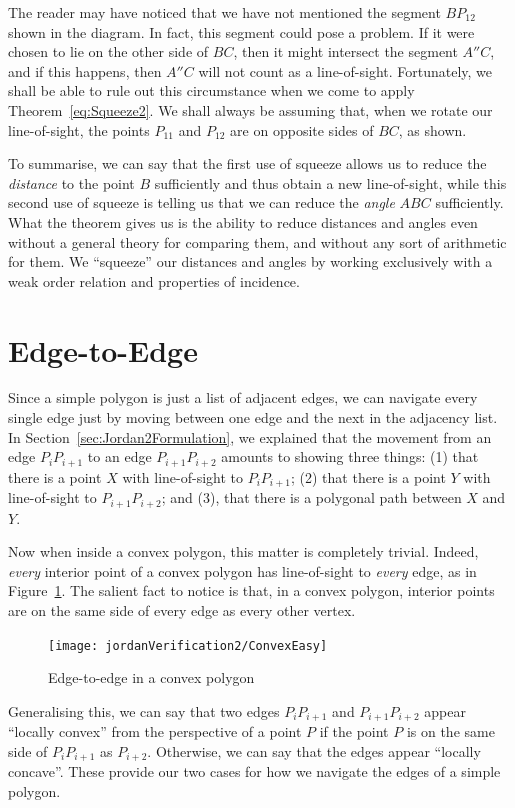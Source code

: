 The reader may have noticed that we have not mentioned the segment $BP_{12}$ shown in the diagram. In fact, this segment could pose a problem. If it were chosen to lie on the other side of $BC$, then it might intersect the segment $A''C$, and if this happens, then $A''C$ will not count as a line-of-sight. Fortunately, we shall be able to rule out this circumstance when we come to apply Theorem~\ref{eq:Squeeze2}. We shall always be assuming that, when we rotate our line-of-sight, the points $P_{11}$ and $P_{12}$ are on opposite sides of $BC$, as shown.

To summarise, we can say that the first use of squeeze allows us to reduce the \emph{distance} to the point $B$ sufficiently and thus obtain a new line-of-sight, while this second use of squeeze is telling us that we can reduce the \emph{angle} $ABC$ sufficiently. What the theorem gives us is the ability to reduce distances and angles even without a general theory for comparing them, and without any sort of arithmetic for them. We ``squeeze'' our distances and angles by working exclusively with a weak order relation and properties of incidence.

\section{Edge-to-Edge}\label{sec:NavigationVerification}
Since a simple polygon is just a list of adjacent edges, we can navigate every single edge just by moving between one edge and the next in the adjacency list. In Section~\ref{sec:Jordan2Formulation}, we explained that the movement from an edge $P_{i}P_{i+1}$ to an edge $P_{i+1}P_{i+2}$ amounts to showing three things: (1) that there is a point $X$ with line-of-sight to $P_{i}P_{i+1}$; (2) that there is a point $Y$ with line-of-sight to $P_{i+1}P_{i+2}$; and (3), that there is a polygonal path between $X$ and $Y$.

Now when inside a convex polygon, this matter is completely trivial. Indeed, \emph{every} interior point of a convex polygon has line-of-sight to \emph{every} edge, as in Figure~\ref{fig:ConvexEasy}. The salient fact to notice is that, in a convex polygon, interior points are on the same side of every edge as every other vertex. 

\begin{figure}
\centering\texttt{[image: jordanVerification2/ConvexEasy]}
\caption{Edge-to-edge in a convex polygon}
\label{fig:ConvexEasy}
\end{figure}
Generalising this, we can say that two edges $P_{i}P_{i+1}$ and $P_{i+1}P_{i+2}$ appear ``locally convex'' from the perspective of a point $P$ if the point $P$ is on the same side of $P_{i}P_{i+1}$ as $P_{i+2}$. Otherwise, we can say that the edges appear ``locally concave''. These provide our two cases for how we navigate the edges of a simple polygon.

